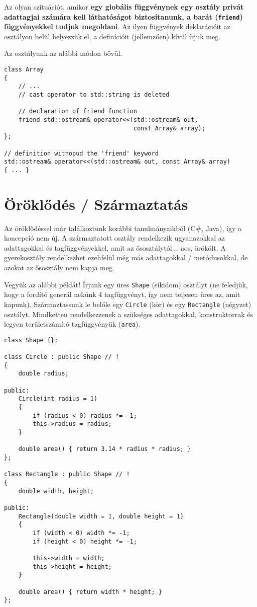 \documentclass[a4paper, 11pt, oneside]{book}
\begin{document}
Az olyan szituációt, amikor \textbf{egy globális függvénynek egy osztály privát adattagjai számára kell láthatóságot biztosítanunk, a barát (\texttt{friend}) függvényekkel tudjuk megoldani}. Az ilyen függvények deklarációit az osztályon belül helyezzük el, a definícióit (jellemzően) kívül írjuk meg.

Az osztályunk az alábbi módon bővül.

\begin{lstlisting}[style=cppstyle]
class Array
{
	// ...
	// cast operator to std::string is deleted
	
	// declaration of friend function
	friend std::ostream& operator<<(std::ostream& out, 
									const Array& array);
};

// definition withopud the 'friend' keyword
std::ostream& operator<<(std::ostream& out, const Array& array) 
{ ... }
\end{lstlisting}

\newpage

\section{Öröklődés / Származtatás}

Az öröklődéssel már találkoztunk korábbi tanulmányaikból (C\#, Java), így a koncepció nem új. A származtatott osztály rendelkezik ugyanazokkal az adattagokkal és tagfüggvényekkel, amit az ősosztálytól... nos, örökölt. A gyerekosztály rendelkezhet ezehfelül még más adattagokkal / metódusokkal, de azokat az ősosztály nem kapja meg.

Vegyük az alábbi példát! Írjunk egy üres \verb*|Shape| (síkidom) osztályt (ne feledjük, hogy a fordító generál nekünk 4 tagfüggvényt, így nem teljesen üres az, amit kapunk). Származtassunk le belőle egy \verb*|Circle| (kör) és egy \verb*|Rectangle| (négyzet) osztályt. Mindketten rendelkezzenek a szükséges adattagokkal, konstruktorrak és legyen területszámító tagfüggvényük (\verb*|area|).

\begin{lstlisting}[style=cppstyle]
class Shape {};

class Circle : public Shape // !
{
	double radius;
	
public:
	Circle(int radius = 1)
	{
		if (radius < 0) radius *= -1;
		this->radius = radius;
	}
	
	double area() { return 3.14 * radius * radius; }
};

class Rectangle : public Shape // !
{
	double width, height;
	
public:
	Rectangle(double width = 1, double height = 1)
	{
		if (width < 0) width *= -1;
		if (height < 0) height *= -1;
		
		this->width = width;
		this->height = height;
	}
	
	double area() { return width * height; }
};
\end{lstlisting}
\end{document}
